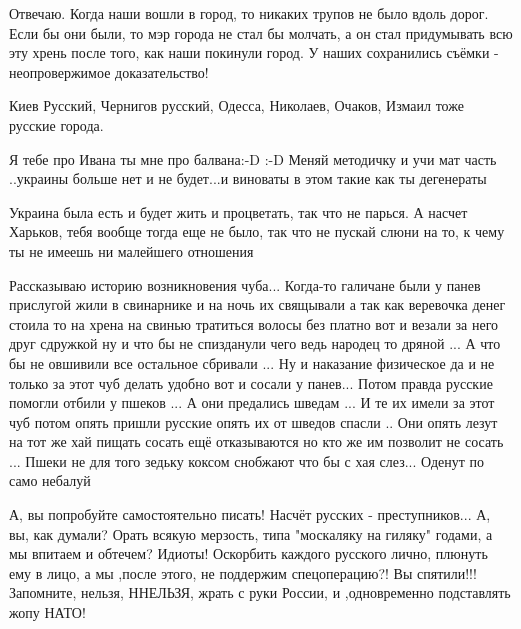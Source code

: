 
Отвечаю. Когда наши вошли в город, то никаких трупов не было вдоль дорог. Если
бы они были, то мэр города не стал бы молчать, а он стал придумывать всю эту
хрень после того, как наши покинули город. У наших сохранились съёмки -
неопровержимое доказательство!


Киев Русский, Чернигов русский, Одесса, Николаев, Очаков, Измаил тоже русские
города.

Я тебе про Ивана ты мне про балвана:-D :-D
Меняй методичку и учи мат часть
..украины больше нет и не будет...и виноваты в этом такие как ты дегенераты


Украина была есть и будет жить и процветать, так что не парься. А насчет
Харьков, тебя вообще тогда еще не было, так что не пускай слюни на то, к чему
ты не имеешь ни малейшего отношения


Рассказываю историю возникновения чуба... Когда-то галичане были у панев
прислугой жили в свинарнике и на ночь их свящывали а так как веревочка денег
стоила то на хрена на свинью тратиться волосы без платно вот и везали за него
друг сдружкой ну и что бы не спизданули чего ведь народец то дряной ... А что
бы не овшивили все остальное сбривали ... Ну и наказание физическое да и не
только за этот чуб делать удобно вот и сосали у панев... Потом правда русские
помогли отбили у пшеков ... А они предались шведам ... И те их имели за этот
чуб потом опять пришли русские опять их от шведов спасли .. Они опять лезут на
тот же хай пищать сосать ещё отказываются но кто же им позволит не сосать ...
Пшеки не для того зедьку коксом снобжают что бы с хая слез... Оденут по само
небалуй


А, вы попробуйте самостоятельно писать! Насчёт русских - преступников... А, вы,
как думали? Орать всякую мерзость, типа "москаляку на гиляку" годами, а мы
впитаем и обтечем? Идиоты! Оскорбить каждого русского лично, плюнуть ему в
лицо, а мы ,после этого, не поддержим спецоперацию?! Вы спятили!!! Запомните,
нельзя, ННЕЛЬЗЯ, жрать с руки России, и ,одновременно подставлять жопу НАТО!

